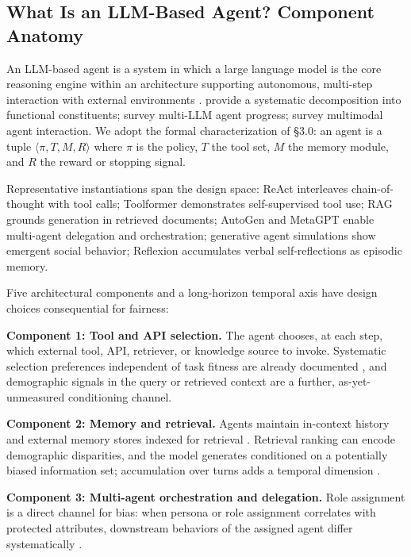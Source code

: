 \documentclass[acmsmall,nonacm]{acmart}
\begin{document}
\subsection{What Is an LLM-Based Agent? Component Anatomy}

An LLM-based agent is a system in which a large language model is the core reasoning engine within an architecture supporting autonomous, multi-step interaction with external environments \cite{wang2024survey,xi2023rise}. \cite{sumers2024cognitive} provide a systematic decomposition into functional constituents; \cite{guo2024large} survey multi-LLM agent progress; \cite{durante2024agent} survey multimodal agent interaction. We adopt the formal characterization of \S{}3.0: an agent is a tuple $\langle \pi, T, M, R \rangle$ where $\pi$ is the policy, $T$ the tool set, $M$ the memory module, and $R$ the reward or stopping signal.

Representative instantiations span the design space: ReAct \cite{yao2023react} interleaves chain-of-thought with tool calls; Toolformer \cite{schick2023toolformer} demonstrates self-supervised tool use; RAG \cite{lewis2020retrieval} grounds generation in retrieved documents; AutoGen \cite{wu2023autogen} and MetaGPT \cite{hong2024metagpt} enable multi-agent delegation and orchestration; generative agent simulations \cite{park2023generative} show emergent social behavior; Reflexion \cite{shinn2023reflexion} accumulates verbal self-reflections as episodic memory.

Five architectural components and a long-horizon temporal axis have design choices consequential for fairness:

\textbf{Component 1: Tool and API selection.} The agent chooses, at each step, which external tool, API, retriever, or knowledge source to invoke. Systematic selection preferences independent of task fitness are already documented \cite{blankenstein2025biasbusters}, and demographic signals in the query or retrieved context are a further, as-yet-unmeasured conditioning channel.

\textbf{Component 2: Memory and retrieval.} Agents maintain in-context history and external memory stores indexed for retrieval \cite{lewis2020retrieval}. Retrieval ranking can encode demographic disparities, and the model generates conditioned on a potentially biased information set; accumulation over turns adds a temporal dimension \cite{fan2024fairmt}.

\textbf{Component 3: Multi-agent orchestration and delegation.} Role assignment is a direct channel for bias: when persona or role assignment correlates with protected attributes, downstream behaviors of the assigned agent differ systematically \cite{gupta2023bias,nguyen2025social,wu2023autogen,park2023generative}.
\end{document}
